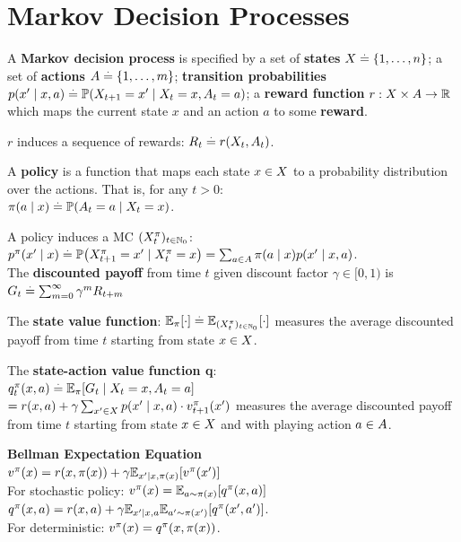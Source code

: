 \section{Markov Decision Processes}
\begin{framed}
    A \textbf{Markov decision process} is specified by a set of \textbf{states} $X \overset{.}{=} \{1, \dots, n\}$; a set of \textbf{actions} $A \overset{.}{=} \{1, \dots, m\}$; \textbf{transition probabilities} ${p(x' \mid x, a) \defeq \Pr{X_{t+1} = x' \mid X_t = x, A_t = a}}$; a \textbf{reward function} $r : X \times A \to \mathbb{R}$ which maps the current state $x$ and an action $a$ to some \textbf{reward}. \\
\end{framed}
$r$ induces a sequence of rewards: $R_t \overset{.}{=} r(X_t, A_t)$.
\begin{framed}
    A \textbf{policy} is a function that maps each state $x \in X$ to a probability distribution over the actions. That is, for any $t > 0$: \\
    $\pi(a \mid x) \defeq \Pr{A_t = a \mid X_t = x}$.
\end{framed}
A policy induces a MC $(X_t^\pi)_{t\in\mathbb{N}_0}$: $p^\pi(x' \mid x) \defeq \Pr{X_{t+1}^\pi = x' \mid X_t^\pi = x} = \sum_{a \in \sA} \pi(a \mid x) p(x' \mid x, a)$.\\
The \textbf{discounted payoff} from time $t$ given discount factor $\gamma \in [0, 1)$ is\\
 $G_t \overset{.}{=} \sum_{m=0}^\infty \gamma^m R_{t+m}$
\begin{framed}
    The \textbf{state value function}: $\E[\pi]{\cdot} \defeq \E[(X_t^\pi)_{t\in\Nat_0}]{\cdot}$ measures the average discounted payoff from time $t$ starting from state $x \in X$.
\end{framed}
\begin{framed}
    The \textbf{state-action value function q}: \\
    $\q[\pi]{x}{a}[t] \defeq \E[\pi]{G_t \mid X_t = x, A_t = a}$ \\
    $ = r(x, a) + \gamma \sum_{x' \in \sX} p(x' \mid x, a) \cdot \v[\pi]{x'}[t+1]$ measures the average discounted payoff from time $t$ starting from state $x \in X$ and with playing action $a \in A$.
\end{framed}
\begin{framed}
    \textbf{Bellman Expectation Equation}\\
    $\v[\pi]{x} = r(x, \pi(x)) + \gamma \E[x' \mid x, \pi(x)]{\v[\pi]{x'}}$ \\
    For stochastic policy: $\v[\pi]{x} = \E[a \sim \pi(x)]{\q[\pi]{x}{a}}$ \\
    $\q[\pi]{x}{a} = r(x, a) + \gamma \E*[x' \mid x, a]{\E[a' \sim \pi(x')]{\q[\pi]{x'}{a'}}}$.\\
    For deterministic: $\v[\pi]{x} = \q[\pi]{x}{\pi(x)}$.
\end{framed}
